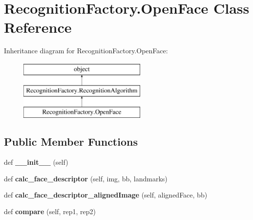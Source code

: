 \hypertarget{classRecognitionFactory_1_1OpenFace}{}\section{Recognition\+Factory.\+Open\+Face Class Reference}
\label{classRecognitionFactory_1_1OpenFace}
Inheritance diagram for Recognition\+Factory.\+Open\+Face\+:\begin{figure}[H]
\begin{center}
\leavevmode
\includegraphics[height=3.000000cm]{classRecognitionFactory_1_1OpenFace}
\end{center}
\end{figure}
\subsection*{Public Member Functions}
\begin{DoxyCompactItemize}
\item 
def {\bfseries \+\_\+\+\_\+init\+\_\+\+\_\+} (self)\hypertarget{classRecognitionFactory_1_1OpenFace_a555a6f98154c13480cd0221bbb616cdc}{}\label{classRecognitionFactory_1_1OpenFace_a555a6f98154c13480cd0221bbb616cdc}

\item 
def {\bfseries calc\+\_\+face\+\_\+descriptor} (self, img, bb, landmarks)\hypertarget{classRecognitionFactory_1_1OpenFace_a836912f1319b9a6b433439514b411e85}{}\label{classRecognitionFactory_1_1OpenFace_a836912f1319b9a6b433439514b411e85}

\item 
def {\bfseries calc\+\_\+face\+\_\+descriptor\+\_\+aligned\+Image} (self, aligned\+Face, bb)\hypertarget{classRecognitionFactory_1_1OpenFace_aaf88498d63d98982547f19ee314e5bba}{}\label{classRecognitionFactory_1_1OpenFace_aaf88498d63d98982547f19ee314e5bba}

\item 
def {\bfseries compare} (self, rep1, rep2)\hypertarget{classRecognitionFactory_1_1OpenFace_afa0790d2f75b5191265048c584dbb858}{}\label{classRecognitionFactory_1_1OpenFace_afa0790d2f75b5191265048c584dbb858}

\end{DoxyCompactItemize}
